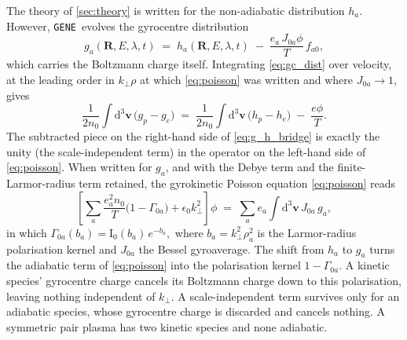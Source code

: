 \documentclass{jpp}
\newcommand{\rmd}{\text{d}}
\newcommand{\bv}{\mathbf{v}}
\newcommand{\kperp}{k_\perp}
\newcommand{\gene}{\texttt{GENE}}
\begin{document}
The theory of \cref{sec:theory} is written for the non-adiabatic distribution $h_a$. However, \gene\ evolves the gyrocentre distribution
\begin{equation}\label{eq:gc_dist}
g_a(\mathbf{R}, E, \lambda, t) \;=\; h_a(\mathbf{R}, E, \lambda, t) \;-\; \frac{e_a\, J_{0a}\phi}{T}\,f_{a0},
\end{equation}
which carries the Boltzmann charge itself. Integrating \cref{eq:gc_dist} over velocity, at the leading order in $\kperp\rho$ at which \cref{eq:poisson} was written and where $J_{0a}\to1$, gives
\begin{equation}\label{eq:g_h_bridge}
\frac{1}{2n_0}\int \rmd^3\bv\,\bigl(g_p - g_e\bigr) \;=\; \frac{1}{2n_0}\int \rmd^3\bv\,\bigl(h_p - h_e\bigr) \;-\; \frac{e\phi}{T}.
\end{equation}
The subtracted piece on the right-hand side of \cref{eq:g_h_bridge} is exactly the unity (the scale-independent term) in the operator on the left-hand side of \cref{eq:poisson}. When written for $g_a$, and with the Debye term and the finite-Larmor-radius term retained, the gyrokinetic Poisson equation \cref{eq:poisson} reads
\begin{equation}\label{eq:gene_poisson}
\left[\sum_a \frac{e_a^2 n_0}{T}\bigl(1 - \Gamma_{0a}\bigr) + \epsilon_0 \kperp^2\right]\phi \;=\; \sum_a e_a \int \rmd^3 \bv\, J_{0a}\, g_a ,
\end{equation}
in which $\Gamma_{0a}(b_a) = \mathrm{I}_0(b_a)\,e^{-b_a},$ where $b_a = \kperp^2 \rho_a^2$ is the Larmor-radius polarisation kernel and $J_{0a}$ the Bessel gyroaverage. The shift from $h_a$ to $g_a$ turns the adiabatic term of \cref{eq:poisson} into the polarisation kernel $1 - \Gamma_{0a}$. A kinetic species' gyrocentre charge cancels its Boltzmann charge down to this polarisation, leaving nothing independent of $\kperp$. A scale-independent term survives only for an adiabatic species, whose gyrocentre charge is discarded and cancels nothing. A symmetric pair plasma has two kinetic species and none adiabatic.
\end{document}
